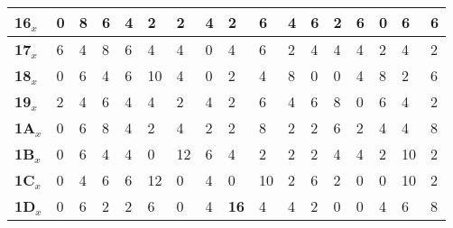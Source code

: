 \begin{longtable}[c]{|l|l|l|l|l|l|l|l|l|l|l|l|l|l|l|l|l|}
\textbf{16$_x$} & 0              & 8              & 6              & 4              & 2              & 2              & 4              & 2              & 6              & 4              & 6              & 2              & 6              & 0              & 6              & 6              \\ \hline
\textbf{17$_x$} & 6              & 4              & 8              & 6              & 4              & 4              & 0              & 4              & 6              & 2              & 4              & 4              & 4              & 2              & 4              & 2              \\ \hline
\textbf{18$_x$} & 0              & 6              & 4              & 6              & 10             & 4              & 0              & 2              & 4              & 8              & 0              & 0              & 4              & 8              & 2              & 6              \\ \hline
\textbf{19$_x$} & 2              & 4              & 6              & 4              & 4              & 2              & 4              & 2              & 6              & 4              & 6              & 8              & 0              & 6              & 4              & 2              \\ \hline
\textbf{1A$_x$} & 0              & 6              & 8              & 4              & 2              & 4              & 2              & 2              & 8              & 2              & 2              & 6              & 2              & 4              & 4              & 8              \\ \hline
\textbf{1B$_x$} & 0              & 6              & 4              & 4              & 0              & 12             & 6              & 4              & 2              & 2              & 2              & 4              & 4              & 2              & 10             & 2              \\ \hline
\textbf{1C$_x$} & 0              & 4              & 6              & 6              & 12             & 0              & 4              & 0              & 10             & 2              & 6              & 2              & 0              & 0              & 10             & 2              \\ \hline
\textbf{1D$_x$} & 0              & 6              & 2              & 2              & 6              & 0              & 4              & \textbf{16}             & 4              & 4              & 2              & 0              & 0              & 4              & 6              & 8              \\ \hline

\end{longtable}
